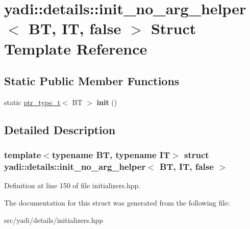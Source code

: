 \hypertarget{structyadi_1_1details_1_1init__no__arg__helper_3_01_b_t_00_01_i_t_00_01false_01_4}{}\section{yadi\+:\+:details\+:\+:init\+\_\+no\+\_\+arg\+\_\+helper$<$ BT, IT, false $>$ Struct Template Reference}
\label{structyadi_1_1details_1_1init__no__arg__helper_3_01_b_t_00_01_i_t_00_01false_01_4}
\subsection*{Static Public Member Functions}
\begin{DoxyCompactItemize}
\item 
\mbox{\label{structyadi_1_1details_1_1init__no__arg__helper_3_01_b_t_00_01_i_t_00_01false_01_4_a43b81409264cbd054bab2f66a886c47b}} 
static \hyperlink{namespaceyadi_a92290eb27cd90666aa87b17d854af9fe}{ptr\+\_\+type\+\_\+t}$<$ BT $>$ {\bfseries init} ()
\end{DoxyCompactItemize}


\subsection{Detailed Description}
\subsubsection*{template$<$typename BT, typename IT$>$\newline
struct yadi\+::details\+::init\+\_\+no\+\_\+arg\+\_\+helper$<$ B\+T, I\+T, false $>$}



Definition at line 150 of file initializers.\+hpp.



The documentation for this struct was generated from the following file\+:\begin{DoxyCompactItemize}
\item 
src/yadi/details/initializers.\+hpp\end{DoxyCompactItemize}

